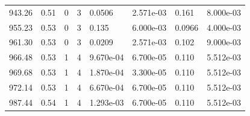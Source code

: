 \documentclass[preview]{standalone}
\begin{document}
{{{{\begin{tabular}{L{1.2cm}C{1.2cm} C{0.3cm}C{0.5cm} C{1.4cm}C{1.4cm} C{1.4cm}C{1.4cm}}
  943.26  &  0.51  & 0     &  3 &  0.0506  & 2.571e-03  & 0.161 &  8.000e-03   \\ 
  955.23  &  0.53  & 0     &  3 &  0.135  & 6.000e-03  & 0.0966 &  4.000e-03   \\ 
  961.30  &  0.53  & 0     &  3 &  0.0209  & 2.571e-03  & 0.102 &  9.000e-03   \\ 
  966.48  &  0.53  & 1     &  4 &  9.670e-04  & 6.700e-05  & 0.110 &  5.512e-03   \\ 
  969.68  &  0.53  & 1     &  4 &  1.870e-04  & 3.300e-05  & 0.110 &  5.512e-03   \\ 
  972.14  &  0.53  & 1     &  4 &  6.670e-04  & 6.700e-05  & 0.110 &  5.512e-03   \\ 
  987.44  &  0.54  & 1     &  4 &  1.293e-03  & 6.700e-05  & 0.110 &  5.512e-03   \\ 
\hline 
\end{tabular} 

}}}}
\end{document}
